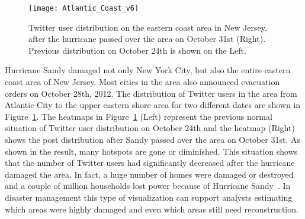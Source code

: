 \begin{figure}[tbh]
\centering
\texttt{[image: Atlantic\_Coast\_v6]}
\caption{Twitter user distribution on the eastern coast area in New Jersey, after the hurricane passed over the area on October 31st (Right). Previous distribution on October 24th is shown on the Left.}
\label{fig:atlantic_coast}
\end{figure}

Hurricane Sandy damaged not only New York City, but also the entire eastern coast area of New Jersey. 
Most cities in the area also announced evacuation orders on October 28th, 2012.
The distribution of Twitter users in the area from Atlantic City to the upper eastern shore area for two different dates are shown in Figure~\ref{fig:atlantic_coast}.
The heatmaps in Figure~\ref{fig:atlantic_coast} (Left) represent the previous normal situation of Twitter user distribution on October 24th and the heatmap (Right) shows the post distribution after Sandy passed over the area on October 31st.
As shown in the result, many hotspots are gone or diminished.
This situation shows that the number of Twitter users had significantly decreased after the hurricane damaged the area.
In fact, a huge number of homes were damaged or destroyed and a couple of million households lost power because of Hurricane Sandy~\cite{WKP:2012:EHS}.
In disaster management this type of visualization can support analysts estimating which areas were highly damaged and even which areas still need reconstruction.



%
%
%
%



